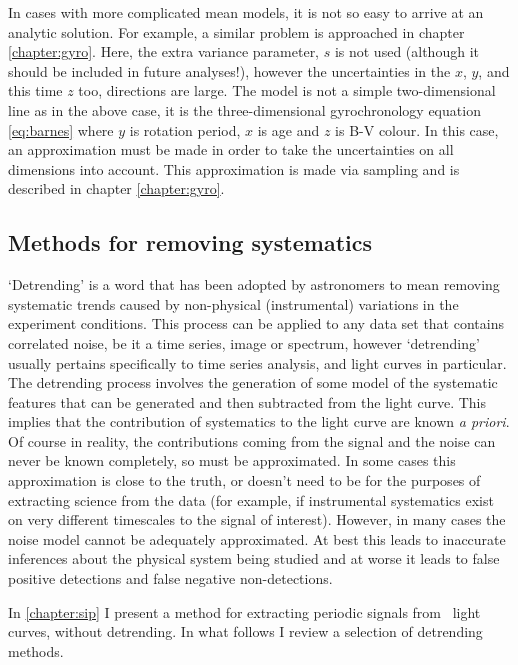 In cases with more complicated mean models, it is not so easy to arrive at an
analytic solution.
For example, a similar problem is approached in chapter \ref{chapter:gyro}.
Here, the extra variance parameter, $s$ is not used (although it should be
included in future analyses!), however the uncertainties in the $x$, $y$, and
this time $z$ too, directions are large.
The model is not a simple two-dimensional line as in the above case, it is the
three-dimensional gyrochronology equation \ref{eq:barnes} where $y$ is
rotation period, $x$ is age and $z$ is B-V colour.
In this case, an approximation must be made in order to take the uncertainties
on all dimensions into account.
This approximation is made via sampling and is described in chapter
\ref{chapter:gyro}.

\subsection{Methods for removing systematics}
\label{sec:detrending}

`Detrending' is a word that has been adopted by astronomers to mean removing
systematic trends caused by non-physical (\eg instrumental) variations in the
experiment conditions.
This process can be applied to any data set that contains correlated noise, be
it a time series, image or spectrum, however `detrending' usually pertains
specifically to time series analysis, and light curves in particular.
The detrending process involves the generation of some model of the systematic
features that can be generated and then subtracted from the light curve.
This implies that the contribution of systematics to the light curve are known
{\it a priori}.
Of course in reality, the contributions coming from the signal and the noise
can never be known completely, so must be approximated.
In some cases this approximation is close to the truth, or doesn't need to be
for the purposes of extracting science from the data (for example, if
instrumental systematics exist on very different timescales to the signal of
interest).
However, in many cases the noise model cannot be adequately approximated.
At best this leads to inaccurate inferences about the physical system being
studied and at worse it leads to false positive detections and false negative
non-detections.

In \textsection \ref{chapter:sip} I present a method for extracting periodic
signals from \ktwo\ light curves, without detrending.
In what follows I review a selection of detrending methods.

